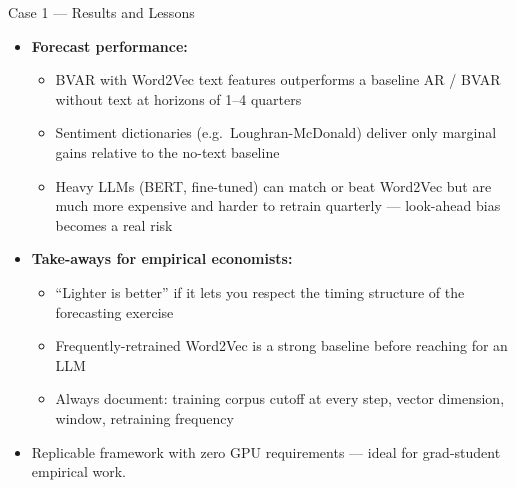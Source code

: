 \begin{frame}{Case 1 --- Results and Lessons}
\begin{itemize}
\item \textbf{Forecast performance:}
\begin{itemize}
    \item BVAR with Word2Vec text features outperforms a baseline AR / BVAR without text at horizons of 1--4 quarters
    \item Sentiment dictionaries (e.g.\ Loughran-McDonald) deliver only marginal gains relative to the no-text baseline
    \item Heavy LLMs (BERT, fine-tuned) can match or beat Word2Vec but are much more expensive and harder to retrain quarterly --- look-ahead bias becomes a real risk
\end{itemize}

\medskip
\item \textbf{Take-aways for empirical economists:}
\begin{itemize}
    \item ``Lighter is better'' if it lets you respect the timing structure of the forecasting exercise
    \item Frequently-retrained Word2Vec is a strong baseline before reaching for an LLM
    \item Always document: training corpus cutoff at every step, vector dimension, window, retraining frequency
\end{itemize}

\medskip
\item Replicable framework with zero GPU requirements --- ideal for grad-student empirical work.
\end{itemize}
\end{frame}

